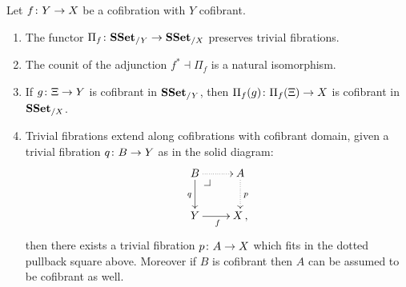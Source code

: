 \documentclass[reqno,10pt,a4paper,oneside,draft]{amsart}
\begin{document}
\begin{lemma}\label{Lemma:ForTheExtProperty} Let $f \colon Y \rightarrow X$ be a cofibration with $Y$ cofibrant. 
\begin{enumerate}[$(i)$]
\item The functor $\Pi_f \colon \mathbf{SSet}_{/Y} \rightarrow \mathbf{SSet}_{/X}$ preserves trivial fibrations.
\item The counit of the adjunction $f^* \dashv \Pi_f$ is a natural isomorphism.
\item If $g \colon \Xi \to Y$  is cofibrant in $\mathbf{SSet}_{/Y}$, then $\Pi_f(g) \colon \Pi_f(\Xi) \to X$  is cofibrant in~$\mathbf{SSet}_{/X}$.
\item Trivial fibrations extend along cofibrations with cofibrant domain, \ie given a trivial fibration $q
 \colon B \to Y$  as in the solid diagram:
\[
\xymatrix{
B \ar@{.>}[r] \ar[d]_{q} \drpullback  & A \ar@{.>}[d]^{p} \\
Y \ar[r]_f &  X \, ,}
\]
then there exists a trivial fibration $p \colon A \rightarrow X$ which fits in the dotted pullback square above. Moreover if $B$ is cofibrant  then 
$A$ can be assumed to be 
cofibrant as well.
\end{enumerate}
\end{lemma}
\end{document}
